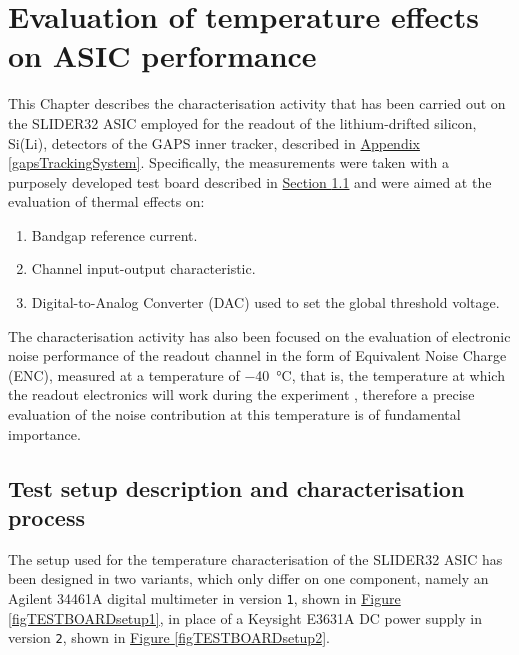 \chapter{Evaluation of temperature effects on ASIC performance} \label{ch1}

This Chapter describes the characterisation activity that has been carried out on the SLIDER32 ASIC employed for the readout of the lithium-drifted silicon, Si(Li), detectors of the GAPS inner tracker, described in \hyperref[gapsTrackingSystem]{Appendix \ref{gapsTrackingSystem}}. Specifically, the measurements were taken with a purposely developed test board described in \hyperref[testboardsetup]{Section \ref{testboardsetup}} and were aimed at the evaluation of thermal effects on:

\begin{enumerate}
    \itemsep0em 
    \item Bandgap reference current.
    \item Channel input-output characteristic.
    \item Digital-to-Analog Converter (DAC) used to set the global threshold voltage.
\end{enumerate}

\par
The characterisation activity has also been focused on the evaluation of electronic noise performance of the readout channel in the form of Equivalent Noise Charge (ENC), measured at a temperature of \SI{-40}{\celsius}, that is, the temperature at which the readout electronics will work during the experiment \cite{re_2022_a}, therefore a precise evaluation of the noise contribution at this temperature is of fundamental importance.


\section[Test setup description and characterisation process]{Test setup description and characterisation\\ process} \label{testboardsetup}

The setup used for the temperature characterisation of the SLIDER32 ASIC has been designed in two variants, which only differ on one component, namely an Agilent 34461A digital multimeter in version \texttt{1}, shown in \hyperref[figTESTBOARDsetup1]{Figure \ref{figTESTBOARDsetup1}}, in place of a Keysight E3631A DC power supply in version \texttt{2}, shown in \hyperref[figTESTBOARDsetup2]{Figure \ref{figTESTBOARDsetup2}}.

